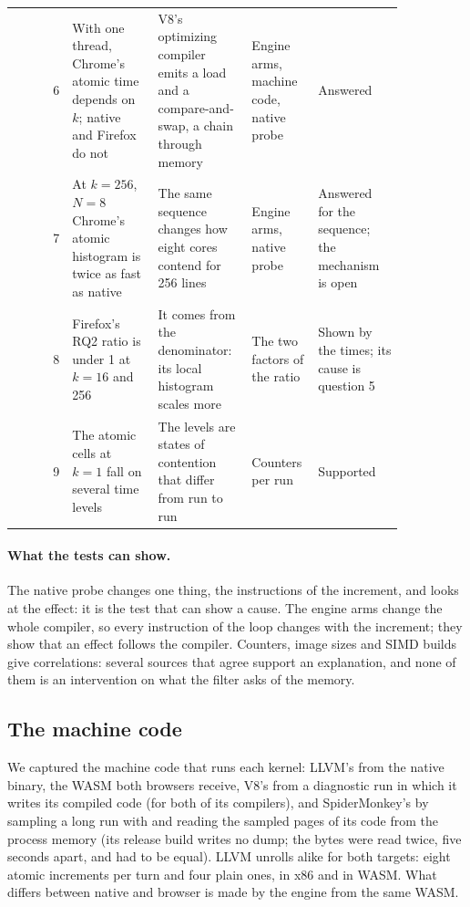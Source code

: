 \begin{table}[htbp]
\begin{tabular}{rp{0.22\linewidth}p{0.24\linewidth}p{0.17\linewidth}p{0.22\linewidth}}
6 & With one thread, Chrome's atomic time depends on $k$; native and Firefox do not & V8's optimizing compiler emits a load and a compare-and-swap, a chain through memory & Engine arms, machine code, native probe & Answered \\
7 & At $k=256$, $N=8$ Chrome's atomic histogram is twice as fast as native & The same sequence changes how eight cores contend for 256 lines & Engine arms, native probe & Answered for the sequence; the mechanism is open \\
8 & Firefox's RQ2 ratio is under 1 at $k=16$ and 256 & It comes from the denominator: its local histogram scales more & The two factors of the ratio & Shown by the times; its cause is question 5 \\
9 & The atomic cells at $k=1$ fall on several time levels & The levels are states of contention that differ from run to run & Counters per run & Supported \\
\bottomrule
\end{tabular}
\end{table}

\paragraph{What the tests can show.} The native probe changes one thing, the
instructions of the increment, and looks at the effect: it is the test that
can show a cause. The engine arms change the whole compiler, so every
instruction of the loop changes with the increment; they show that an
effect follows the compiler. Counters, image sizes and SIMD builds give
correlations: several sources that agree support an explanation, and none
of them is an intervention on what the filter asks of the memory.

\subsection{The machine code}
\label{sec:engine-code}

We captured the machine code that runs each kernel: LLVM's from the native
binary, the WASM both browsers receive, V8's from a diagnostic run in which
it writes its compiled code (for both of its compilers), and
SpiderMonkey's by sampling a long run with  and reading the
sampled pages of its code from the process memory (its release build writes
no dump; the bytes were read twice, five seconds apart, and had to be
equal). LLVM unrolls alike for both targets: eight atomic increments per
turn and four plain ones, in x86 and in WASM. What differs between native
and browser is made by the engine from the same WASM.

